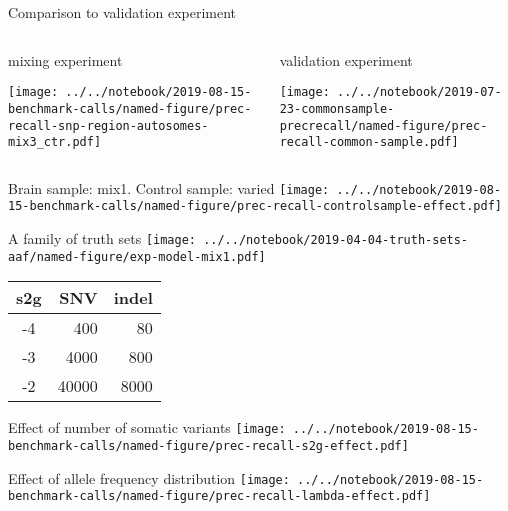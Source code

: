 \documentclass{beamer}
\begin{document}
\begin{frame}{Comparison to validation experiment}
\begin{columns}[t]
\begin{column}{0.4\textwidth}

mixing experiment

\texttt{[image: ../../notebook/2019-08-15-benchmark-calls/named-figure/prec-recall-snp-region-autosomes-mix3\_ctr.pdf]}
\end{column}
\begin{column}{0.7\textwidth}

validation experiment

\texttt{[image: ../../notebook/2019-07-23-commonsample-precrecall/named-figure/prec-recall-common-sample.pdf]}
\end{column}
\end{columns}
\end{frame}

\begin{frame}{Brain sample: mix1. Control sample: varied}
\texttt{[image: ../../notebook/2019-08-15-benchmark-calls/named-figure/prec-recall-controlsample-effect.pdf]}
\end{frame}

\begin{frame}[label=familyoftruthsets]{A family of truth sets}
\texttt{[image: ../../notebook/2019-04-04-truth-sets-aaf/named-figure/exp-model-mix1.pdf]}
{\tiny
\begin{tabular}{c|r|r}
s2g & SNV & indel \\
\hline
-4 & 400 & 80 \\
-3 & 4000 & 800 \\
-2 & 40000 & 8000 \\
\end{tabular}
}
\end{frame}

\begin{frame}{Effect of number of somatic variants}
\texttt{[image: ../../notebook/2019-08-15-benchmark-calls/named-figure/prec-recall-s2g-effect.pdf]}
\end{frame}


\begin{frame}{Effect of allele frequency distribution}
\texttt{[image: ../../notebook/2019-08-15-benchmark-calls/named-figure/prec-recall-lambda-effect.pdf]}
\end{frame}
\end{document}
